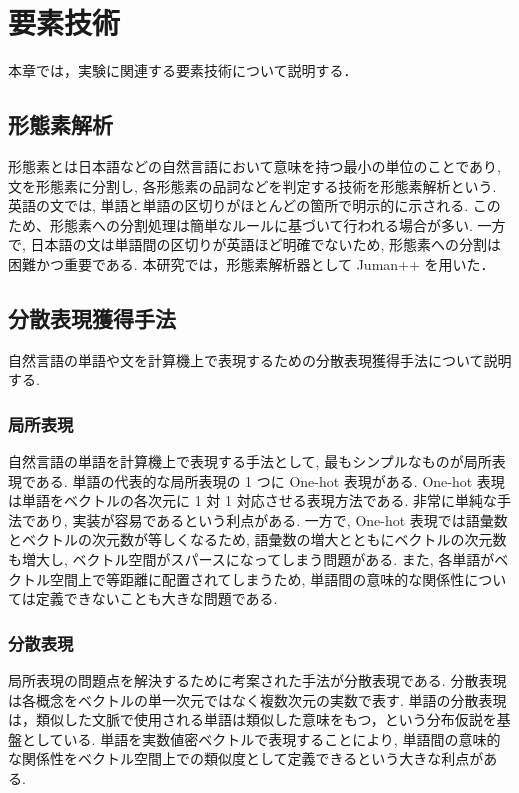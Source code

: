 \newpage
\changeindent{0cm}
\section{要素技術}
\changeindent{2cm}

本章では，実験に関連する要素技術について説明する．

\changeindent{0cm}
\subsection{形態素解析}
\changeindent{2cm}

形態素とは日本語などの自然言語において意味を持つ最小の単位のことであり,
文を形態素に分割し, 各形態素の品詞などを判定する技術を形態素解析という.
英語の文では, 単語と単語の区切りがほとんどの箇所で明示的に示される.
このため、形態素への分割処理は簡単なルールに基づいて行われる場合が多い.
一方で, 日本語の文は単語間の区切りが英語ほど明確でないため,
形態素への分割は困難かつ重要である.
本研究では，形態素解析器として Juman++\cite{jumanpp} を用いた．

\changeindent{0cm}
\subsection{分散表現獲得手法}
\changeindent{2cm}
自然言語の単語や文を計算機上で表現するための分散表現獲得手法について説明する.

\changeindent{0cm}
\subsubsection{局所表現}
\changeindent{2cm}
自然言語の単語を計算機上で表現する手法として, 最もシンプルなものが局所表現である.
単語の代表的な局所表現の 1 つに One-hot 表現がある.
One-hot 表現は単語をベクトルの各次元に 1 対 1 対応させる表現方法である.
非常に単純な手法であり, 実装が容易であるという利点がある.
一方で, One-hot 表現では語彙数とベクトルの次元数が等しくなるため,
語彙数の増大とともにベクトルの次元数も増大し, ベクトル空間がスパースになってしまう問題がある.
また, 各単語がベクトル空間上で等距離に配置されてしまうため,
単語間の意味的な関係性については定義できないことも大きな問題である.

\changeindent{0cm}
\subsubsection{分散表現}
\changeindent{2cm}
局所表現の問題点を解決するために考案された手法が分散表現である. 分散表現は各概念をベクトルの単一次元ではなく複数次元の実数で表す.
単語の分散表現は，類似した文脈で使用される単語は類似した意味をもつ，という分布仮説を基盤としている.
単語を実数値密ベクトルで表現することにより,
単語間の意味的な関係性をベクトル空間上での類似度として定義できるという大きな利点がある. 

